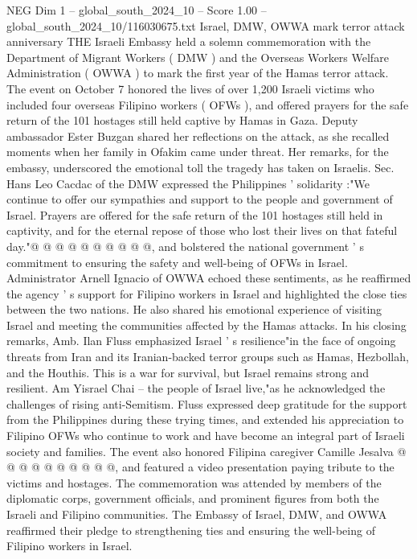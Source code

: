 \begin{textsample}{NEG Dim 1 – global\_south\_2024\_10 – Score 1.00 – global\_south\_2024\_10/116030675.txt}  \label{ex:f1_neg_288}
Israel, DMW, OWWA mark terror attack anniversary THE Israeli Embassy held a solemn commemoration with the Department of Migrant Workers ( DMW ) and the Overseas Workers Welfare Administration ( OWWA ) to mark the first year of the Hamas terror attack.
The event on October 7 honored the lives of over 1,200 Israeli victims who included four overseas Filipino workers ( OFWs ), and offered prayers for the safe return of the 101 hostages still held captive by Hamas in Gaza.
Deputy ambassador Ester Buzgan shared her reflections on the attack, as she recalled moments when her family in Ofakim came under threat.
Her remarks, for the embassy, underscored the emotional toll the tragedy has taken on Israelis.
Sec.
Hans Leo Cacdac of the DMW expressed the Philippines ' solidarity :"We continue to offer our sympathies and support to the people and government of Israel.
Prayers are offered for the safe return of the 101 hostages still held in captivity, and for the eternal repose of those who lost their lives on that fateful day."@ @ @ @ @ @ @ @ @ @, and bolstered the national government ' s commitment to ensuring the safety and well-being of OFWs in Israel.
Administrator Arnell Ignacio of OWWA echoed these sentiments, as he reaffirmed the agency ' s support for Filipino workers in Israel and highlighted the close ties between the two nations.
He also shared his emotional experience of visiting Israel and meeting the communities affected by the Hamas attacks.
In his closing remarks, Amb.
Ilan Fluss emphasized Israel ' s resilience"in the face of ongoing threats from Iran and its Iranian-backed terror groups such as Hamas, Hezbollah, and the Houthis.
This is a war for survival, but Israel remains strong and resilient.
Am Yisrael Chai -- the people of Israel live,"as he acknowledged the challenges of rising anti-Semitism.
Fluss expressed deep gratitude for the support from the Philippines during these trying times, and extended his appreciation to Filipino OFWs who continue to work and have become an integral part of Israeli society and families.
The event also honored Filipina caregiver Camille Jesalva @ @ @ @ @ @ @ @ @ @, and featured a video presentation paying tribute to the victims and hostages.
The commemoration was attended by members of the diplomatic corps, government officials, and prominent figures from both the Israeli and Filipino communities.
The Embassy of Israel, DMW, and OWWA reaffirmed their pledge to strengthening ties and ensuring the well-being of Filipino workers in Israel.

\end{textsample}
